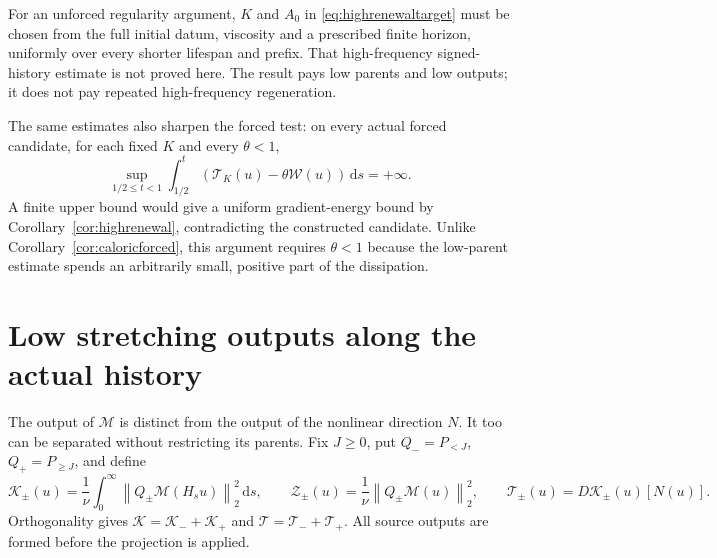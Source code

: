 \documentclass[11pt]{article}
\newcommand{\dd}{\,\mathrm d}
\newcommand{\norm}[1]{\left\lVert#1\right\rVert}
\begin{document}
For an unforced regularity argument, $K$ and $A_0$ in
\eqref{eq:highrenewaltarget} must be chosen from the full initial datum,
viscosity and a prescribed finite horizon, uniformly over every shorter
lifespan and prefix. That high-frequency signed-history estimate is not
proved here. The result pays low parents and low outputs; it does not
pay repeated high-frequency regeneration.

The same estimates also sharpen the forced test: on every actual forced
candidate, for each fixed $K$ and every $\theta<1$,
\[
 \sup_{1/2\leq t<1}\int_{1/2}^t
       (\mathcal T_K(u)-\theta\mathcal W(u))\dd s=+\infty.
\]
A finite upper bound would give a uniform gradient-energy bound by
Corollary~\ref{cor:highrenewal}, contradicting the constructed candidate.
Unlike Corollary~\ref{cor:caloricforced}, this argument requires
$\theta<1$ because the low-parent estimate spends an arbitrarily small,
positive part of the dissipation.

\section{Low stretching outputs along the actual history}

The output of $\mathcal M$ is distinct from the output of the nonlinear
direction $N$. It too can be separated without restricting its parents.
Fix $J\geq0$, put $Q_-=P_{<J}$, $Q_+=P_{\geq J}$, and define
\[
 \mathcal K_\pm(u)=\frac1\nu\int_0^\infty
          \norm{Q_\pm\mathcal M(H_su)}_2^2\dd s,\qquad
 \mathcal Z_\pm(u)=\frac1\nu\norm{Q_\pm\mathcal M(u)}_2^2,\qquad
 \mathcal T_\pm(u)=D\mathcal K_\pm(u)[N(u)].
\]
Orthogonality gives $\mathcal K=\mathcal K_-+\mathcal K_+$ and
$\mathcal T=\mathcal T_-+\mathcal T_+$. All source outputs are formed
before the projection is applied.
\end{document}
